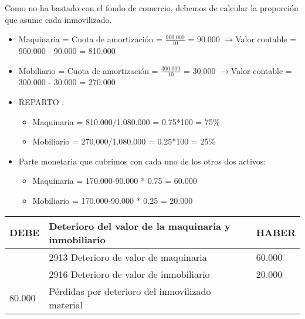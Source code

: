 \documentclass[a4paper,12pt]{article}
\newcommand{\VC}{Valor contable = }
\newcommand{\cuotaamort}{Cuota de amortización = }
\newcommand{\myequation}[2]{\ensuremath{\frac{#1}{#2}}}
\newcommand{\flechita}{$\rightarrow$}
\begin{document}
Como no ha bastado con el fondo de comercio, debemos de calcular la proporción que asume cada inmovilizado.
\begin{itemize}
    \item Maquinaria = \cuotaamort \myequation{900.000}{10} = 90.000 \flechita \VC 900.000 - 90.000 = 810.000
    \item Mobiliario = \cuotaamort \myequation{300.000}{10} = 30.000 \flechita \VC 300.000 - 30.000 = 270.000
    \item REPARTO :
    \begin{itemize}
        \item Maquinaria = 810.000/1.080.000 = 0.75*100 = 75\%
        \item Mobiliario = 270.000/1.080.000 = 0.25*100 = 25\%
    \end{itemize}
    \item Parte monetaria que cubrimos con cada uno de los otros dos activos:
    \begin{itemize}
        \item Maquinaria = 170.000-90.000 * 0.75 = 60.000
        \item Mobiliario = 170.000-90.000 * 0.25 = 20.000
    \end{itemize}
\end{itemize}
\begin{table}[H]
    \centering
    \begin{tabular}{|p{3cm}|p{6cm}|p{3cm}|}
    \hline
    \textbf{DEBE} & \textbf{Deterioro del valor de la maquinaria y inmobiliario} & \textbf{HABER} \\
    \hline
    & 2913 Deterioro de valor de maquinaria& 60.000\\
    \hline
    & 2916 Deterioro de valor de inmobiliario& 20.000\\
    \hline
    80.000& Pérdidas por deterioro del inmovilizado material& \\
    \hline
    \end{tabular}
\end{table}
\end{document}
